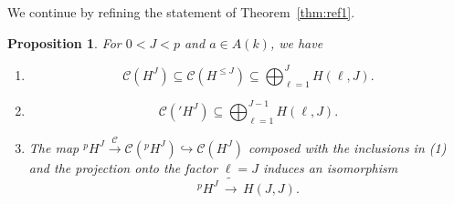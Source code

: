 \documentclass[12pt,reqno]{amsart}
\numberwithin{equation}{section}
\theoremstyle{plain}
\newtheorem{prop}[subsection]{Proposition}
\theoremstyle{definition}
\theoremstyle{remark}
\numberwithin{equation}{section}
\newcommand{\CC}{\mathcal{C}}
\newcommand{\<}{\langle}
\renewcommand{\>}{\rangle}
\newcommand{\into}{\hookrightarrow}
\newcommand{\isoto}{\,\tilde{\to}\,}
\newcommand{\labeledto}[1]{\overset{#1}{\to}}
\def\HJ{H^J}
\def\HlJ{H^{\le J}}
\def\prH{{}'H^J}
\def\pH{{}^pH^J}
\begin{document}
We continue by refining the statement of Theorem~\ref{thm:ref1}.

\begin{prop}\label{prop:containments}
  For $0<J<p$ and  $a\in A(k)$, we have
  \begin{enumerate}
  \item
\[    \CC\left(\HJ\right)\subseteq\CC\left(\HlJ\right)\subseteq
    \bigoplus_{\ell=1}^J H(\ell,J).\]
  \item
\[    \CC\left(\prH\right)\subseteq
    \bigoplus_{\ell=1}^{J-1} H(\ell,J).\]
\item The map $\pH\labeledto{\CC}\CC(\pH)\into\CC(\HJ)$ composed with
  the inclusions in (1) and the projection onto the factor $\ell=J$ 
  induces an isomorphism
  \[\pH\isoto H(J,J).\]
\end{enumerate}
\end{prop}
\end{document}
